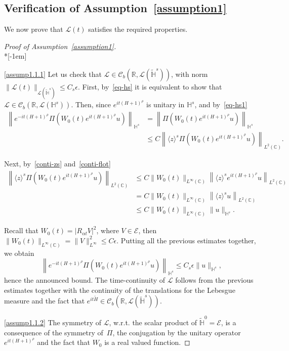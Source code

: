 \documentclass[AHL,Unicode,published]{cedram}
\newcommand{\C}{\mathbb{C}}
\newcommand{\R}{\mathbb{R}}
\newcommand{\HH}{\mathbb{H}}
\newcommand{\E}{\mathcal{E}}
\newcommand{\clL}{\mathcal{L}}
\newcommand{\clC}{\mathcal{C}}
\renewcommand{\L}{\mathscr{L}}
\newcommand*\eps{\epsilon}
\newcommand{\wt}{\widetilde}
\newcommand{\<}{\langle}
\renewcommand{\>}{\rangle}
\newcommand{\R}{\mathbb{R}}
\begin{document}
\subsection{Verification of Assumption~\ref{assumption1}}\label{para4.3}
We now prove that $ \L(t)$ satisfies the required properties.
\begin{proof}[{Proof of Assumption~\ref{assumption1}}]\ \\*[-1em]

\eqref{assump1.1.1} Let us check that $\L \in \clC_b(\R, \clL(\widetilde{\HH}^{s}))$, with norm $\| \L(t) \|_{ \clL(\widetilde{\HH}^{s})} \leq C_s \eps$. First, by~\eqref{eq-hs} it is equivalent to show that $\L \in \clC_b(\R, \clL({\HH}^{s}))$. Then, since $e^{it {(H+1)^{\rho}}} $ is unitary in ${\HH}^{s}$, and by~\eqref{eq-hs1}
\begin{align*}
\left\| e^{-it (H+1)^{\rho}} \Pi\left(W_0(t)e^{it (H+1)^{\rho}} u\right)
\right\|_{{\HH}^{s}}&=\left\| \Pi\left(W_0(t)e^{it (H+1)^{\rho}} u\right) \right\|_{{\HH}^{s}}\\
&\leq C \left\| \langle z \rangle^{ s} \Pi \left(W_0(t)e^{it (H+1)^{\rho}} u\right) \right\|_{L^2(\C)}.
\end{align*}


Next, by~\eqref{conti-zs} and~\eqref{conti-flot}
\begin{align*}
\left\| \langle z \rangle^{ s} \Pi \left(W_0(t)e^{it (H+1)^{\rho}} u\right) \right\|_{L^2(\C)} &\leq C \| W_0(t) \|_{L^\infty(\C)} \left\| \langle z \rangle^{ s} e^{it (H+1)^{\rho}} u \right\|_{L^2(\C)}\\
&= C \| W_0(t) \|_{L^\infty(\C)} \left\| \langle z \rangle^{ s} u\right\|_{L^2(\C)}\\
& \leq C \| W_0(t) \|_{L^\infty(\C)} \| u \|_{\HH^s}.
\end{align*}


Recall that $W_0(t)=|R_{\alpha t}V|^2$, where $V \in \E$, then $\| W_0(t)
\|_{L^\infty(\C)} =\| V\|^2_{L^\infty} \leq C \eps $. Putting all the previous estimates together, we obtain
\[
\left\| e^{-it (H+1)^{\rho}} \Pi\left(W_0(t)e^{it (H+1)^{\rho}} u\right) \right\|_{{\HH}^{s}} \leq C_s\eps \| u\|_{{\HH}^{s}},
\]
hence the announced bound. The time-continuity of $\L$ follows from the previous estimates together with the continuity of the translations for the Lebesgue measure and the fact that $e^{it \wt{H}} \in \clC_b(\R, \clL(\widetilde{\HH}^{s}))$.

\eqref{assump1.1.2} The symmetry of $\L$, w.r.t. the scalar product of $\widetilde{\HH}^{0}=\E$, is a consequence of the symmetry of~$\Pi$, the conjugation by the unitary operator $e^{it {(H+1)^{\rho}}} $ and the fact that $W_0$ is a real valued function.


\end{proof}
\end{document}
